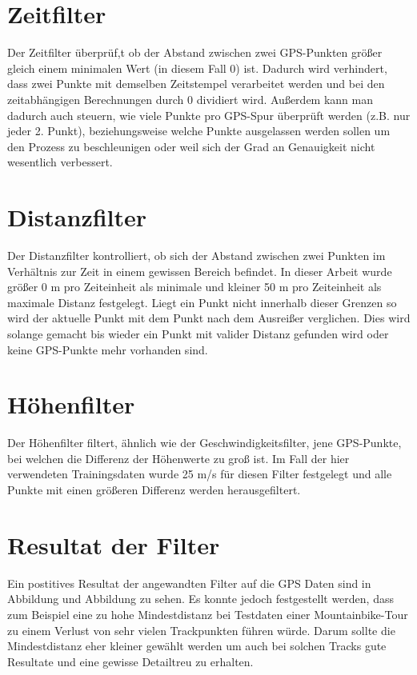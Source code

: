 \section*{Zeitfilter}
Der Zeitfilter überprüf,t ob der Abstand zwischen zwei GPS-Punkten größer gleich einem minimalen Wert (in diesem Fall 0) ist. Dadurch wird verhindert, dass zwei Punkte mit demselben Zeitstempel verarbeitet werden und bei den zeitabhängigen Berechnungen durch 0 dividiert wird. Außerdem kann man dadurch auch steuern, wie viele Punkte pro GPS-Spur überprüft werden  (z.B. nur jeder 2. Punkt), beziehungsweise welche Punkte ausgelassen werden sollen um den Prozess zu beschleunigen oder weil sich der Grad an Genauigkeit nicht wesentlich verbessert.

\section*{Distanzfilter}
Der Distanzfilter kontrolliert, ob sich der Abstand zwischen zwei Punkten im Verhältnis zur Zeit in einem gewissen Bereich befindet. In dieser Arbeit wurde größer 0 m pro Zeiteinheit als minimale und kleiner 50 m pro Zeiteinheit als maximale Distanz festgelegt. Liegt ein Punkt nicht innerhalb dieser Grenzen so wird der aktuelle Punkt mit dem Punkt nach dem Ausreißer verglichen. Dies wird solange gemacht bis wieder ein Punkt mit valider Distanz gefunden wird oder keine GPS-Punkte mehr vorhanden sind.

\section*{Höhenfilter}
Der Höhenfilter filtert, ähnlich wie der Geschwindigkeitsfilter, jene GPS-Punkte, bei welchen die Differenz der Höhenwerte zu groß ist. Im Fall der hier verwendeten Trainingsdaten wurde 25 m/s  für diesen Filter festgelegt und alle Punkte mit einen größeren Differenz werden herausgefiltert.

\section*{Resultat der Filter}
Ein postitives Resultat der angewandten Filter auf die GPS Daten sind in Abbildung  und Abbildung  zu sehen. Es konnte jedoch festgestellt werden, dass zum Beispiel eine zu hohe Mindestdistanz bei Testdaten einer Mountainbike-Tour zu einem Verlust von sehr vielen Trackpunkten führen würde. Darum sollte die Mindestdistanz eher kleiner gewählt werden um auch bei solchen Tracks gute Resultate und eine gewisse Detailtreu zu erhalten.


\clearpage